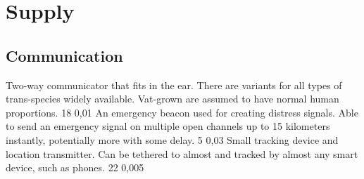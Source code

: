 	\section{Supply}
\subsection{Communication}
\vspace{10mm}
\begin{multicols}{2}
    {Two-way communicator that fits in the ear.
        There are variants for all types of trans-species widely available.
        Vat-grown are assumed to have normal human proportions.}
    {18}
    {0,01}
    {An emergency beacon used for creating distress signals.
        Able to send an emergency signal on multiple open channels up to 15 kilometers instantly,
        potentially more with some delay.}
    {5}
    {0,03}
    {Small tracking device and location transmitter.
        Can be tethered to almost and tracked by almost any smart device, such as phones.}
    {22}
    {0,005}
\end{multicols}

